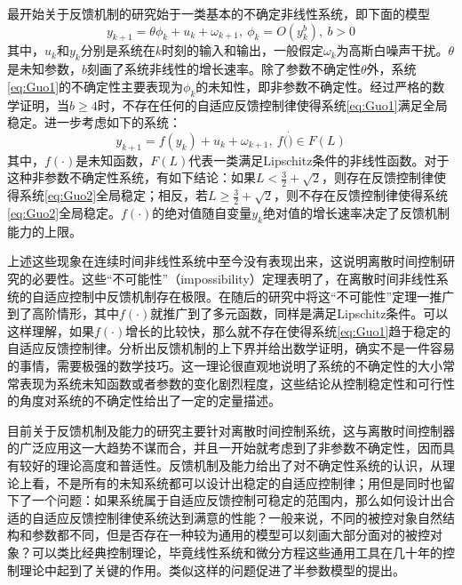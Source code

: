 最开始关于反馈机制的研究始于一类基本的不确定非线性系统，即下面的模型
\begin{equation}%
\label{eq:Guo1}
y_{k+1} = \theta \phi_{k} + u_{k} + \omega_{k+1},\ \phi_{k}=O(y_{k}^{b}),\ b>0
\end{equation}
其中，$u_{k}$和$y_{k}$分别是系统在$k$时刻的输入和输出，一般假定$\omega_{k}$为高斯白噪声干扰。$\theta$是未知参数，$b$刻画了系统非线性的增长速率。除了参数不确定性$\theta$外，系统\eqref{eq:Guo1}的不确定性主要表现为$\phi_{k}$的未知性，即非参数不确定性。经过严格的数学证明，当$b\geq4$时，不存在任何的自适应反馈控制律使得系统\eqref{eq:Guo1}满足全局稳定。进一步考虑如下的系统：
\begin{equation}%
\label{eq:Guo2}
y_{k+1} = f(y_{k}) + u_{k} + \omega_{k+1},\ f(\dot)\in F(L)
\end{equation}
其中，$f(\cdot)$是未知函数，$F(L)$代表一类满足Lipschitz条件的非线性函数。对于这种非参数不确定性系统，有如下结论：如果$L<\frac32+\sqrt{2}$，则存在反馈控制律使得系统\eqref{eq:Guo2}全局稳定；相反，若$L\geq\frac32+\sqrt{2}$，则不存在反馈控制律使得系统\eqref{eq:Guo2}全局稳定。$f(\cdot)$的绝对值随自变量$y_{k}$绝对值的增长速率决定了反馈机制能力的上限。

上述这些现象在连续时间非线性系统中至今没有表现出来，这说明离散时间控制研究的必要性。这些“不可能性”（impossibility）定理表明了，在离散时间非线性系统的自适应控制中反馈机制存在极限。在随后的研究中将这“不可能性”定理一推广到了高阶情形，其中$f(\cdot)$就推广到了多元函数，同样是满足Lipschitz条件。可以这样理解，如果$f(\cdot)$增长的比较快，那么就不存在使得系统\eqref{eq:Guo1}趋于稳定的自适应反馈控制律。分析出反馈机制的上下界并给出数学证明，确实不是一件容易的事情，需要极强的数学技巧。这一理论很直观地说明了系统的不确定性的大小常常表现为系统未知函数或者参数的变化剧烈程度，这些结论从控制稳定性和可行性的角度对系统的不确定性给出了一定的定量描述。

目前关于反馈机制及能力的研究主要针对离散时间控制系统，这与离散时间控制器的广泛应用这一大趋势不谋而合，并且一开始就考虑到了非参数不确定性，因而具有较好的理论高度和普适性。反馈机制及能力给出了对不确定性系统的认识，从理论上看，不是所有的未知系统都可以设计出稳定的自适应控制律；用但是同时也留下了一个问题：如果系统属于自适应反馈控制可稳定的范围内，那么如何设计出合适的自适应反馈控制律使系统达到满意的性能？一般来说，不同的被控对象自然结构和参数都不同，但是否存在一种较为通用的模型可以刻画大部分面对的被控对象？可以类比经典控制理论，毕竟线性系统和微分方程这些通用工具在几十年的控制理论中起到了关键的作用。类似这样的问题促进了半参数模型的提出。

